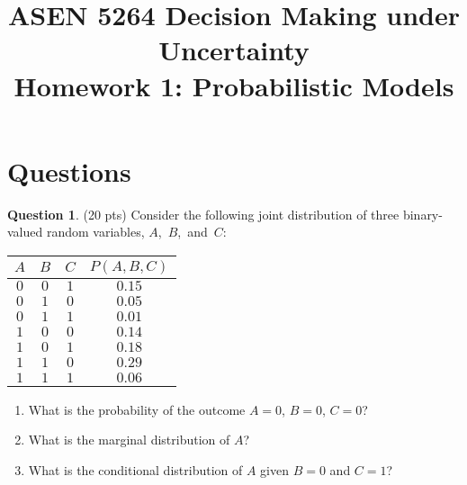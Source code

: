\documentclass{article}
\title{ASEN 5264 Decision Making under Uncertainty\\
       Homework 1: Probabilistic Models}
\theoremstyle{definition}
\newtheorem{question}[thm]{Question}
\begin{document}
\maketitle

\section{Questions}

\begin{question} (20 pts)
    Consider the following joint distribution of three binary-valued random variables, \mbox{$A$, $B$, and $C$}:

    \begin{minipage}{0.3\linewidth}
        \vspace{1em}
    {\small
    \begin{tabular}{cccc}
        \toprule
            $A$ & $B$ & $C$ & $P(A,B,C)$ \\
        \midrule
            $0$ & $0$ & $1$ & $0.15$ \\
            $0$ & $1$ & $0$ & $0.05$ \\
            $0$ & $1$ & $1$ & $0.01$ \\
            $1$ & $0$ & $0$ & $0.14$ \\
            $1$ & $0$ & $1$ & $0.18$ \\
            $1$ & $1$ & $0$ & $0.29$ \\
            $1$ & $1$ & $1$ & $0.06$ \\
        \bottomrule
    \end{tabular}
    }
    \end{minipage}
    \begin{minipage}{0.7\linewidth}
        \begin{enumerate}[label=\alph*)]
            \item What is the probability of the outcome $A=0$, $B=0$, $C=0$?
            \item What is the marginal distribution of $A$?
            \item What is the conditional distribution of $A$ given $B=0$ and $C=1$?
        \end{enumerate}
    \end{minipage}
\end{question}
\end{document}
